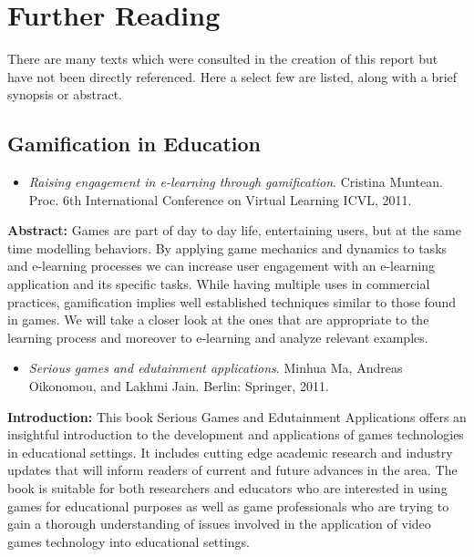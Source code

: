 \documentclass[12pt,a4paper,twoside]{report}
\begin{document}
\chapter{Further Reading}
There are many texts which were consulted in the creation of this report but have not been directly referenced. Here a select few are listed, along with a brief synopsis or abstract. 

\section{Gamification in Education}

\begin{itemize}
	\item \textit{Raising engagement in e-learning through gamification}. Cristina Muntean. Proc. 6th International Conference on Virtual Learning ICVL, 2011.
\end{itemize}

\noindent \textbf{Abstract:} Games are part of day to day life, entertaining users, but at the same time modelling behaviors. By applying game mechanics and dynamics to tasks and e-learning processes we can increase user engagement with an e-learning application and its specific tasks. While having multiple uses in commercial practices, gamification implies well established techniques similar to those found in games. We will take a closer look at the ones that are appropriate to the learning process and moreover to e-learning and analyze relevant examples.

\begin{itemize}
	\item \textit{Serious games and edutainment applications}. Minhua Ma, Andreas Oikonomou, and Lakhmi Jain.  Berlin: Springer, 2011.
\end{itemize}

\noindent \textbf{Introduction:} This book Serious Games and Edutainment Applications offers an insightful introduction to the development and applications of games technologies in educational settings. It includes cutting edge academic research and industry updates that will inform readers of current and future advances in the area. The book is suitable for both researchers and educators who are interested in using games for educational purposes as well as game professionals who are trying to gain a thorough understanding of issues involved in the application of video games technology into educational settings.

\clearpage
\end{document}

